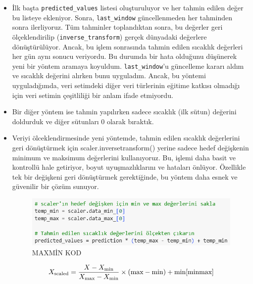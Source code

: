 \documentclass[12pt,a4paper]{article}
\begin{document}
\begin{enumerate}
\begin{itemize}
\item İlk başta \texttt{predicted\_values} listesi oluşturuluyor ve her tahmin edilen değer bu listeye ekleniyor. Sonra, \texttt{last\_window} güncellenmeden her tahminden sonra ilerliyoruz. Tüm tahminler toplandıktan sonra, bu değerler geri ölçeklendirilip (\texttt{inverse\_transform}) gerçek dünyadaki değerlere dönüştürülüyor. Ancak, bu işlem sonrasında tahmin edilen sıcaklık değerleri her gün aynı sonucu veriyordu. Bu durumda bir hata olduğunu düşünerek yeni bir yöntem aramaya koyuldum. \texttt{last\_window}'u güncelleme kararı aldım ve sıcaklık değerini alırken bunu uyguladım. Ancak, bu yöntemi uyguladığımda, veri setimdeki diğer veri türlerinin eğitime katkısı olmadığı için veri setimin çeşitliliği bir anlam ifade etmiyordu.
\item Bir diğer yöntem ise tahmin yapılırken sadece sıcaklık (ilk sütun) değerini doldurduk ve diğer sütunları 0 olarak bıraktık.


 \item Veriyi ölceklendirmesinde yeni yöntemde, tahmin edilen sıcaklık değerlerini geri dönüştürmek için scaler.inversetransform() yerine sadece hedef değişkenin minimum ve maksimum değerlerini kullanıyoruz. Bu, işlemi daha basit ve kontrollü hale getiriyor, boyut uyuşmazlıklarını ve hataları önlüyor. Özellikle tek bir değişkeni geri dönüştürmek gerektiğinde, bu yöntem daha esnek ve güvenilir bir çözüm sunuyor.

 \begin{figure}[h]
  	
  	\vspace{0.5cm} 
  	\centering
  	 \includegraphics[width=\textwidth,height=\textheight,keepaspectratio]{maxminkod.png}
  	\caption{MAXMİN KOD}
  		\vspace{0.7cm}
  	
  \end{figure}
  \[
X_{\text{scaled}} = \frac{X - X_{\min}}{X_{\max} - X_{\min}} \times (\text{max} - \text{min}) + \text{min} \cite{minmax}
\]

\end{itemize}






\end{enumerate}
\end{document}
